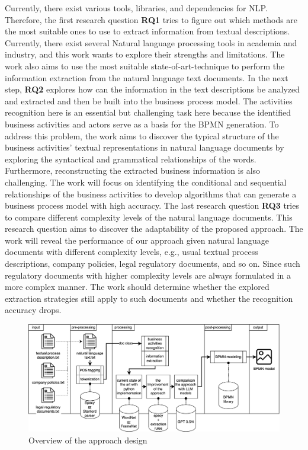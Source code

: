 	
	Currently, there exist various tools, libraries, and dependencies for NLP. Therefore, the first research question \textbf{RQ1} tries to figure out which methods are the most suitable ones to use to extract information from textual descriptions. Currently, there exist several Natural language processing tools in academia and industry, and this work wants to explore their strengths and limitations. The work also aims to use the most suitable state-of-art-technique to perform the information extraction from the natural language text documents. 
	In the next step, \textbf{RQ2} explores how can the information in the text descriptions be analyzed and extracted and then be built into the business process model. The activities recognition here is an essential but challenging task here because the identified business activities and actors serve as a basis for the BPMN generation. To address this problem, the work aims to discover the typical structure of the business activities' textual representations in natural language documents by exploring the syntactical and grammatical relationships of the words. Furthermore, reconstructing the extracted business information is also challenging. The work will focus on identifying the conditional and sequential relationships of the business activities to develop algorithms that can generate a business process model with high accuracy.
	The last research question \textbf{RQ3} tries to compare different complexity levels of the natural language documents. This research question aims to discover the adaptability of the proposed approach. The work will reveal the performance of our approach given natural language documents with different complexity levels, e.g., usual textual process descriptions, company policies, legal regulatory documents, and so on. Since such regulatory documents with higher complexity levels are always formulated in a more complex manner. The work should determine whether the explored extraction strategies still apply to such documents and whether the recognition accuracy drops. 
	
\begin{figure}[h]
    \centering
    \caption{Overview of the approach design}
    \includegraphics[width=1\textwidth]{tum-resources/images/overview.png}
\end{figure}
	
	